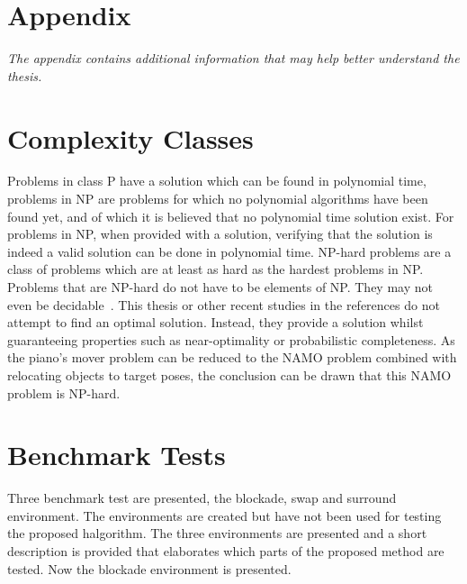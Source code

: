 \chapter*{Appendix}%

\appendix

\textit{The appendix contains additional information that may help better understand the thesis.\bs}

\chapter*{Complexity Classes}%
Problems in class P have a solution which can be found in polynomial time, problems in \ac{NP} are problems for which no polynomial algorithms have been found yet, and of which it is believed that no polynomial time solution exist. For problems in \ac{NP}, when provided with a solution, verifying that the solution is indeed a valid solution can be done in polynomial time. \ac{NP-hard} problems are a class of problems which are at least as hard as the hardest problems in \ac{NP}. Problems that are \ac{NP-hard} do not have to be elements of NP. They may not even be decidable~\cite{pokharel_computational_2020}. This thesis or other recent studies in the references do not attempt to find an optimal solution. Instead, they provide a solution whilst guaranteeing properties such as near-optimality or probabilistic completeness. As the piano's mover problem can be reduced to the \ac{NAMO} problem combined with relocating objects to target poses, the conclusion can be drawn that this \ac{NAMO} problem is \ac{NP-hard}.\bs

\chapter*{Benchmark Tests}%
Three benchmark test are presented, the blockade, swap and surround environment. The environments are created but have not been used for testing the proposed \ac{halgorithm}. The three environments are presented and a short description is provided that elaborates which parts of the proposed method are tested. Now the blockade environment is presented.\bs


